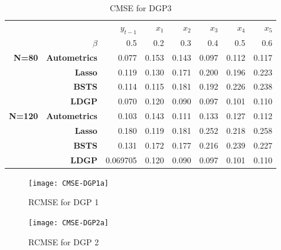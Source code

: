 \documentclass[11pt, oneside]{book}   	%
\begin{document}
\begin{table}[htbp]
  \centering

    \begin{tabular}{rrrrrrrr}

          &       & $y_{t-1}$ & $x_{1}$ & $x_{2}$ & $x_{3}$ & $x_{4}$ & $x_{5}$ \\

          & $\beta$ & 0.5   & 0.2   & 0.3   & 0.4   & 0.5   & 0.6 \\
    \textbf{N=80} & \textbf{Autometrics} & 0.077 & 0.153 & 0.143 & 0.097 & 0.112 & 0.117 \\
    \textbf{} & \textbf{Lasso} & 0.119 & 0.130 & 0.171 & 0.200 & 0.196 & 0.223 \\
    \textbf{} & \textbf{BSTS} & 0.114 & 0.115 & 0.181 & 0.192 & 0.226 & 0.238 \\
    \textbf{} & \textbf{LDGP} & 0.070 & 0.120 & 0.090 & 0.097 & 0.101 & 0.110 \\
    \textbf{N=120} & \textbf{Autometrics} & 0.103 & 0.143 & 0.111 & 0.133 & 0.127 & 0.112 \\
    \textbf{} & \textbf{Lasso} & 0.180 & 0.119 & 0.181 & 0.252 & 0.218 & 0.258 \\
    \textbf{} & \textbf{BSTS} & 0.131 & 0.172 & 0.177 & 0.216 & 0.239 & 0.227 \\
    \textbf{} & \textbf{LDGP} & 0.069705 & 0.120 & 0.090 & 0.097 & 0.101 & 0.110 \\

    \end{tabular}%
      \caption{CMSE for DGP3}
  \label{DGP3CMSE}%
\end{table}%

 








\begin{figure}[h]

\begin{minipage}{.5\textwidth}
\centering
\texttt{[image: CMSE-DGP1a]}
\caption{RCMSE for DGP 1}
\label{RCMSECase1a}
\end{minipage}%
\begin{minipage}{.5\textwidth}
\centering
\texttt{[image: CMSE-DGP2a]}
\caption{RCMSE for DGP 2}
\label{RCMSECase2a}
\end{minipage}

\end{figure}
\end{document}
